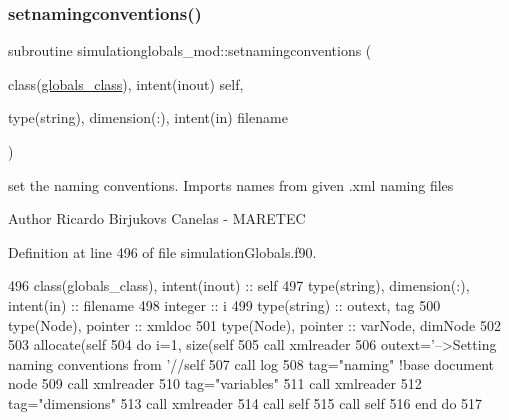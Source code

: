 \subsubsection{\texorpdfstring{setnamingconventions()}{setnamingconventions()}}
{\footnotesize\ttfamily subroutine simulationglobals\+\_\+mod\+::setnamingconventions (\begin{DoxyParamCaption}\item[{class(\mbox{\hyperlink{structsimulationglobals__mod_1_1globals__class}{globals\+\_\+class}}), intent(inout)}]{self,  }\item[{type(string), dimension(\+:), intent(in)}]{filename }\end{DoxyParamCaption})\hspace{0.3cm}{\ttfamily [private]}}



set the naming conventions. Imports names from given .xml naming files 

\begin{DoxyAuthor}{Author}
Ricardo Birjukovs Canelas -\/ M\+A\+R\+E\+T\+EC 
\end{DoxyAuthor}


Definition at line 496 of file simulation\+Globals.\+f90.


\begin{DoxyCode}
496     \textcolor{keywordtype}{class}(globals\_class), \textcolor{keywordtype}{intent(inout)} :: self
497     \textcolor{keywordtype}{type}(string), \textcolor{keywordtype}{dimension(:)}, \textcolor{keywordtype}{intent(in)} :: filename
498     \textcolor{keywordtype}{integer} :: i
499     \textcolor{keywordtype}{type}(string) :: outext, tag
500     \textcolor{keywordtype}{type}(Node), \textcolor{keywordtype}{pointer} :: xmldoc
501     \textcolor{keywordtype}{type}(Node), \textcolor{keywordtype}{pointer} :: varNode, dimNode
502 
503     \textcolor{keyword}{allocate}(self%
504     \textcolor{keywordflow}{do} i=1, \textcolor{keyword}{size}(self%
505         \textcolor{keyword}{call }xmlreader%
506         outext=\textcolor{stringliteral}{'-->Setting naming conventions from '}//self%
507         \textcolor{keyword}{call }log%
508         tag=\textcolor{stringliteral}{"naming"}          \textcolor{comment}{!base document node}
509         \textcolor{keyword}{call }xmlreader%
510         tag=\textcolor{stringliteral}{"variables"}
511         \textcolor{keyword}{call }xmlreader%
512         tag=\textcolor{stringliteral}{"dimensions"}
513         \textcolor{keyword}{call }xmlreader%
514         \textcolor{keyword}{call }self%
515         \textcolor{keyword}{call }self%
516 \textcolor{keywordflow}{    end do}
517 
\end{DoxyCode}
\mbox{\label{namespacesimulationglobals__mod_a046b75c2e163809ea467da6340f1829c}} 

